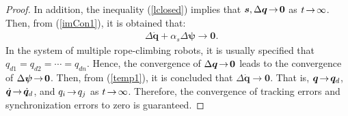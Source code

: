 \documentclass[letterpaper, 10 pt, conference]{ieeeconf}
\begin{document}
\begin{proof}
In addition, the
inequality (\ref{lclosed}) implies that $\bm s, \Delta\bm
q\hspace{-0.05cm}\rightarrow\hspace{-0.05cm}\bm 0$ as
$t\hspace{-0.05cm}\rightarrow\hspace{-0.05cm}\infty$. Then, from (\ref{imCon1}), it is obtained that:
\begin{eqnarray}
&\Delta\dot{\bm q}+\alpha_s\Delta \bm\psi\rightarrow\bm 0.\label{temp1}
\end{eqnarray}
In the system of multiple rope-climbing robots, it is usually specified that $q_{d1}=q_{d2}=\cdots=q_{dn}$. Hence, the convergence of $\Delta\bm
q\hspace{-0.05cm}\rightarrow\hspace{-0.05cm}\bm 0$ leads to the convergence of $\Delta\bm
\psi\hspace{-0.05cm}\rightarrow\hspace{-0.05cm}\bm 0$. Then, from (\ref{temp1}), it is concluded that $\Delta\dot{\bm q}\rightarrow\bm 0$.  That is, $\bm q\hspace{-0.05cm}\rightarrow\hspace{-0.05cm}\bm q_d$, 
$\dot{\bm q}\hspace{-0.05cm}\rightarrow\hspace{-0.05cm}\dot{\bm q}_d$, and $q_i\hspace{-0.05cm}\rightarrow\hspace{-0.05cm}q_j$ as $t\hspace{-0.05cm}\rightarrow\hspace{-0.05cm}\infty$. Therefore, the convergence of tracking errors and synchronization errors to zero is guaranteed.
%

\end{proof}
\end{document}
